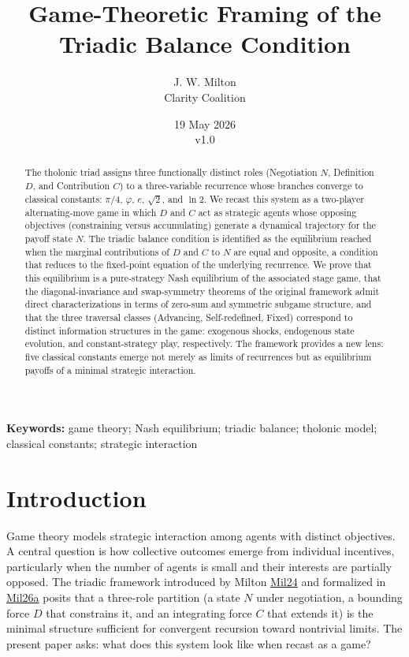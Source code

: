 \documentclass[12pt]{article}
\title{Game-Theoretic Framing of the Triadic Balance Condition}
\author{J. W. Milton\\[4pt]{\small Clarity Coalition}}
\date{\small 19 May 2026 \\ v1.0}
\begin{document}
\maketitle

\noindent\textbf{Keywords:} game theory; Nash equilibrium; triadic balance; tholonic model; classical constants; strategic interaction

\begin{abstract}
The tholonic triad assigns three functionally distinct roles
(Negotiation \(N\), Definition \(D\), and Contribution \(C\)) to a
three-variable recurrence whose branches converge to classical
constants: \(\pi/4\), \(\varphi\), \(e\), \(\sqrt{2}\), and \(\ln 2\).
We recast this system as a two-player alternating-move game in which
\(D\) and \(C\) act as strategic agents whose opposing objectives
(constraining versus accumulating) generate a dynamical trajectory for
the payoff state \(N\). The triadic balance condition is identified as
the equilibrium reached when the marginal contributions of \(D\) and
\(C\) to \(N\) are equal and opposite, a condition that reduces to the
fixed-point equation of the underlying recurrence. We prove that this
equilibrium is a pure-strategy Nash equilibrium of the associated stage
game, that the diagonal-invariance and swap-symmetry theorems of the
original framework admit direct characterizations in terms of zero-sum
and symmetric subgame structure, and that the three traversal classes
(Advancing, Self-redefined, Fixed) correspond to distinct information
structures in the game: exogenous shocks, endogenous state evolution,
and constant-strategy play, respectively. The framework provides a new
lens: five classical constants emerge not merely as limits of
recurrences but as equilibrium payoffs of a minimal strategic
interaction.
\end{abstract}

\section{Introduction}\label{introduction}

Game theory models strategic interaction among agents with distinct
objectives. A central question is how collective outcomes emerge from
individual incentives, particularly when the number of agents is small
and their interests are partially opposed. The triadic framework
introduced by Milton \href{https://tholonia.github.io/the-book/}{Mil24}
and formalized in
\href{https://github.com/baardev/truevalue/blob/main/docnav/Research/papers/1_recursive-tholonic-five-constants/1_recursive-tholonic-five-constants.pdf}{Mil26a}
posits that a three-role partition (a state \(N\) under negotiation, a
bounding force \(D\) that constrains it, and an integrating force \(C\)
that extends it) is the minimal structure sufficient for convergent
recursion toward nontrivial limits. The present paper asks: what does
this system look like when recast as a game?
\end{document}
